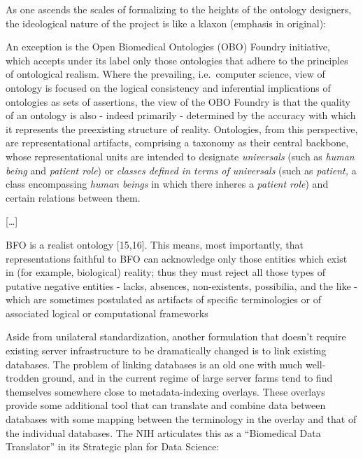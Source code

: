 \documentclass[11pt]{article}
\begin{document}
\begin{multicols}{2}
As one ascends the scales of formalizing to the heights of the ontology
designers, the ideological nature of the project is like a klaxon
(emphasis in original):

\begin{leftbar}
An exception is the Open Biomedical Ontologies (OBO) Foundry initiative,
which accepts under its label only those ontologies that adhere to the
principles of ontological realism. Where the prevailing, i.e.~computer
science, view of ontology is focused on the logical consistency and
inferential implications of ontologies as sets of assertions, the view
of the OBO Foundry is that the quality of an ontology is also - indeed
primarily - determined by the accuracy with which it represents the
preexisting structure of reality. Ontologies, from this perspective, are
representational artifacts, comprising a taxonomy as their central
backbone, whose representational units are intended to designate
\emph{universals} (such as \emph{human being} and \emph{patient role})
or \emph{classes defined in terms of universals} (such as
\emph{patient,} a class encompassing \emph{human beings} in which there
inheres a \emph{patient role}) and certain relations between them.

{[}\ldots{]}

BFO is a realist ontology {[}15,16{]}. This means, most importantly,
that representations faithful to BFO can acknowledge only those entities
which exist in (for example, biological) reality; thus they must reject
all those types of putative negative entities - lacks, absences,
non-existents, possibilia, and the like - which are sometimes postulated
as artifacts of specific terminologies or of associated logical or
computational frameworks \cite{ceustersFoundationsRealistOntology2010} 
\end{leftbar}

Aside from unilateral standardization, another formulation that doesn't
require existing server infrastructure to be dramatically changed is to
link existing databases. The problem of linking databases is an old one
with much well-trodden ground, and in the current regime of large server
farms tend to find themselves somewhere close to metadata-indexing
overlays. These overlays provide some additional tool that can translate
and combine data between databases with some mapping between the
terminology in the overlay and that of the individual databases. The NIH
articulates this as a ``Biomedical Data Translator'' in its Strategic
plan for Data Science:


\end{multicols}
\end{document}
